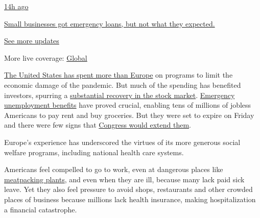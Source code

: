 \href{https://www.nytimes3xbfgragh.onion/live/2020/08/03/business/stock-market-today-coronavirus?action=click\&pgtype=Article\&state=default\&region=MAIN_CONTENT_1\&context=storylines_live_updates\#small-businesses-got-emergency-loans-but-not-what-they-expected}{14h
ago}

\href{https://www.nytimes3xbfgragh.onion/live/2020/08/03/business/stock-market-today-coronavirus?action=click\&pgtype=Article\&state=default\&region=MAIN_CONTENT_1\&context=storylines_live_updates\#small-businesses-got-emergency-loans-but-not-what-they-expected}{Small
businesses got emergency loans, but not what they expected.}

\href{https://www.nytimes3xbfgragh.onion/live/2020/08/03/business/stock-market-today-coronavirus?action=click\&pgtype=Article\&state=default\&region=MAIN_CONTENT_1\&context=storylines_live_updates}{See
more updates}

More live coverage:
\href{https://www.nytimes3xbfgragh.onion/2020/08/03/world/coronavirus-covid-19.html?action=click\&pgtype=Article\&state=default\&region=MAIN_CONTENT_1\&context=storylines_live_updates}{Global}

\href{https://www.bruegel.org/publications/datasets/covid-national-dataset/}{The
United States has spent more than Europe} on programs to limit the
economic damage of the pandemic. But much of the spending has benefited
investors, spurring a
\href{https://www.nytimes3xbfgragh.onion/2020/06/08/business/recession-stock-market-coronavirus.html}{substantial
recovery in the stock market}.
\href{https://www.nytimes3xbfgragh.onion/2020/07/29/business/economy/unemployment-benefits-coronavirus.html}{Emergency
unemployment benefits} have proved crucial, enabling tens of millions of
jobless Americans to pay rent and buy groceries. But they were set to
expire on Friday and there were few signs that
\href{https://www.nytimes3xbfgragh.onion/2020/07/30/us/politics/senate-virus-aid.html}{Congress
would extend them}.

Europe's experience has underscored the virtues of its more generous
social welfare programs, including national health care systems.

Americans feel compelled to go to work, even at dangerous places like
\href{https://www.nytimes3xbfgragh.onion/2020/05/10/business/economy/coronavirus-tyson-plant-iowa.html}{meatpacking
plants}, and even when they are ill, because many lack paid sick leave.
Yet they also feel pressure to avoid shops, restaurants and other
crowded places of business because millions lack health insurance,
making hospitalization a financial catastrophe.

